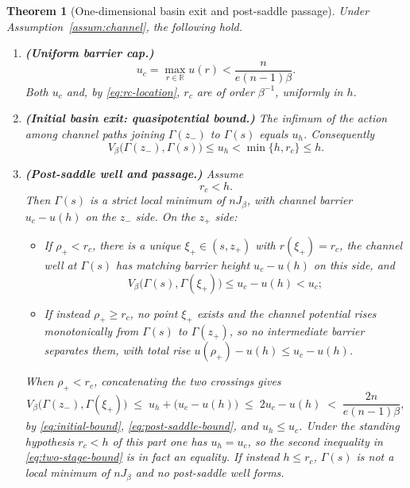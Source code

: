 \documentclass{article} %
\theoremstyle{plain}
\newtheorem{theorem}{Theorem}[section]
\theoremstyle{definition}
\theoremstyle{remark}
\newcommand{\R}{\mathbb{R}}
\begin{document}
\begin{theorem}[One-dimensional basin exit and post-saddle passage]
\label{thm:transition-time}
Under Assumption~\ref{assum:channel}, the following hold.
\begin{enumerate}
    \item \textbf{(Uniform barrier cap.)}
    \begin{equation}
        u_c=\max_{r\in\R}u(r)<\frac{n}{e(n-1)\beta}.
        \label{eq:barrier-cap}
    \end{equation}
    Both $u_c$ and, by \eqref{eq:rc-location}, $r_c$ are of order $\beta^{-1}$, uniformly in $h$.

    \item \textbf{(Initial basin exit: quasipotential bound.)}
    The infimum of the action among channel paths joining $\Gamma(z_-)$ to $\Gamma(s)$ equals $u_h$. Consequently
    \begin{equation}
        V_\beta\bigl(\Gamma(z_-),\Gamma(s)\bigr)\le u_h<\min\{h,r_c\}\le h.
        \label{eq:initial-bound}
    \end{equation}

    \item \textbf{(Post-saddle well and passage.)}
    Assume
    \begin{equation}
        r_c<h.
        \label{eq:high-barrier-regime}
    \end{equation}
    Then $\Gamma(s)$ is a strict local minimum of $nJ_\beta$, with channel barrier $u_c-u(h)$ on the $z_-$ side. On the $z_+$ side:
    \begin{itemize}
        \item If $\rho_+<r_c$, there is a unique $\xi_+\in(s,z_+)$ with $r(\xi_+)=r_c$, the channel well at $\Gamma(s)$ has matching barrier height $u_c-u(h)$ on this side, and
        \begin{equation}
            V_\beta\bigl(\Gamma(s),\Gamma(\xi_+)\bigr)\le u_c-u(h)<u_c;
            \label{eq:post-saddle-bound}
        \end{equation}
        \item If instead $\rho_+\ge r_c$, no point $\xi_+$ exists and the channel potential rises monotonically from $\Gamma(s)$ to $\Gamma(z_+)$, so no intermediate barrier separates them, with total rise $u(\rho_+)-u(h)\le u_c-u(h)$.
    \end{itemize}
    When $\rho_+<r_c$, concatenating the two crossings gives
    \begin{equation}
        V_\beta\bigl(\Gamma(z_-),\Gamma(\xi_+)\bigr) \;\le\; u_h+\bigl(u_c-u(h)\bigr) \;\le\; 2u_c-u(h) \;<\; \frac{2n}{e(n-1)\beta},
        \label{eq:two-stage-bound}
    \end{equation}
    by \eqref{eq:initial-bound}, \eqref{eq:post-saddle-bound}, and $u_h\le u_c$. Under the standing hypothesis $r_c<h$ of this part one has $u_h=u_c$, so the second inequality in \eqref{eq:two-stage-bound} is in fact an equality.
    If instead $h\le r_c$, $\Gamma(s)$ is not a local minimum of $nJ_\beta$ and no post-saddle well forms.
\end{enumerate}
\end{theorem}
\end{document}
